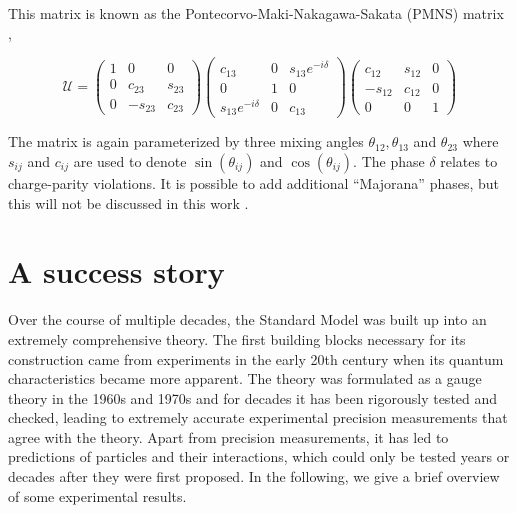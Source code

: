 \noindent This matrix is known as the Pontecorvo-Maki-Nakagawa-Sakata (PMNS) matrix \cite{doi:10.1143/PTP.28.870},

\begin{equation}
\mathcal{U} = \begin{pmatrix}
1 	& 0 		& 0 \\
0 	& c_{23}	& s_{23} \\
0	& -s_{23} 	& c_{23}
\end{pmatrix}
\begin{pmatrix}
c_{13} 				& 0 		& s_{13}e^{-i\delta} \\
0 					& 1			& 0 \\
s_{13}e^{-i\delta}	& 0 		& c_{13}
\end{pmatrix}
\begin{pmatrix}
c_{12} 	& s_{12}	& 0 \\
-s_{12} & c_{12}	& 0 \\
0		& 0			& 1
\end{pmatrix}
\end{equation}

\noindent The matrix is again parameterized by three mixing angles $\theta_{12}, \theta_{13}$ and $\theta_{23}$ where $s_{ij}$ and $c_{ij}$ are used to denote $\sin\left(\theta_{ij}\right)$ and $\cos\left(\theta_{ij}\right)$. The phase $\delta$ relates to charge-parity violations. It is possible to add additional ``Majorana'' phases, but this will not be discussed in this work \cite{Giganti:2017fhf}.
 
\section{A success story}
Over the course of multiple decades, the Standard Model was built up into an extremely comprehensive theory. The first building blocks necessary for its construction came from experiments in the early 20th century when its quantum characteristics became more apparent. The theory was formulated as a gauge theory in the 1960s and 1970s and for decades it has been rigorously tested and checked, leading to extremely accurate experimental precision measurements that agree with the theory. Apart from precision measurements, it has led to predictions of particles and their interactions, which could only be tested years or decades after they were first proposed. In the following, we give a brief overview of some experimental results.

\iffalse
